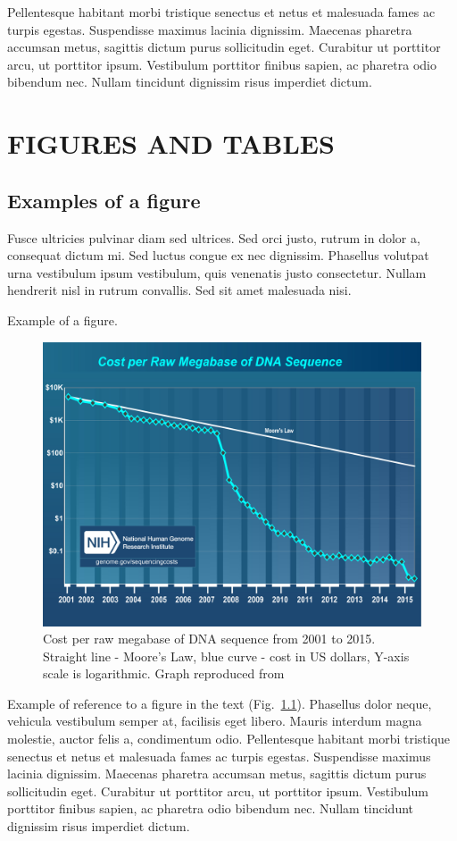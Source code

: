 Pellentesque habitant morbi tristique senectus et netus et malesuada fames ac turpis egestas. Suspendisse maximus lacinia dignissim. Maecenas pharetra accumsan metus, sagittis dictum purus sollicitudin eget. Curabitur ut porttitor arcu, ut porttitor ipsum. Vestibulum porttitor finibus sapien, ac pharetra odio bibendum nec. Nullam tincidunt dignissim risus imperdiet dictum.

\chapter{FIGURES AND TABLES}
\section{Examples of a figure}
Fusce ultricies pulvinar diam sed ultrices. Sed orci justo, rutrum in dolor a, consequat dictum mi. Sed luctus congue ex nec dignissim. Phasellus volutpat urna vestibulum ipsum vestibulum, quis venenatis justo consectetur. Nullam hendrerit nisl in rutrum convallis. Sed sit amet malesuada nisi.

Example of a figure.
\begin{figure}[ht!]
\begin{center}
\includegraphics[scale=0.5]{costperMb2015_4.jpg}
\end{center}
\caption[Cost per raw megabase of DNA sequence from 2001 to 2015]{Cost per raw megabase of DNA sequence from 2001 to 2015. Straight line - Moore's Law, blue curve - cost in US dollars, Y-axis scale is logarithmic. Graph reproduced from }
\label{fig_dna_cost}
\end{figure}
Example of reference to a figure in the text (Fig.~\ref{fig_dna_cost}). Phasellus dolor neque, vehicula vestibulum semper at, facilisis eget libero. Mauris interdum magna molestie, auctor felis a, condimentum odio. Pellentesque habitant morbi tristique senectus et netus et malesuada fames ac turpis egestas. Suspendisse maximus lacinia dignissim. Maecenas pharetra accumsan metus, sagittis dictum purus sollicitudin eget. Curabitur ut porttitor arcu, ut porttitor ipsum. Vestibulum porttitor finibus sapien, ac pharetra odio bibendum nec. Nullam tincidunt dignissim risus imperdiet dictum.

